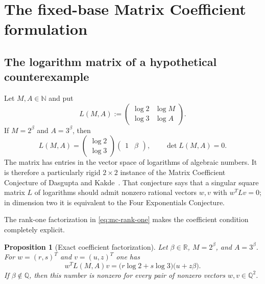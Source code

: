 \documentclass[11pt,oneside]{article}
\newtheorem{proposition}[theorem]{Proposition}
\theoremstyle{definition}
\theoremstyle{remark}
\newcommand{\N}{\mathbb N}
\newcommand{\Q}{\mathbb Q}
\newcommand{\R}{\mathbb R}
\begin{document}
\section{The fixed-base Matrix Coefficient formulation}
\label{sec:matrix-coefficient}

\subsection{The logarithm matrix of a hypothetical counterexample}

Let $M,A\in\N$ and put
\begin{equation}
 L(M,A):=
 \begin{pmatrix}
  \log2 & \log M\\
  \log3 & \log A
 \end{pmatrix}.
 \label{eq:mc-log-matrix}
\end{equation}
If $M=2^\beta$ and $A=3^\beta$, then
\begin{equation}
 L(M,A)=
 \begin{pmatrix}\log2\\ \log3\end{pmatrix}
 \begin{pmatrix}1&\beta\end{pmatrix},
 \qquad
 \det L(M,A)=0.
 \label{eq:mc-rank-one}
\end{equation}
The matrix has entries in the vector space of logarithms of algebraic numbers.  It is therefore
a particularly rigid $2\times2$ instance of the Matrix Coefficient Conjecture of
Dasgupta and Kakde~\cite{DasguptaKakdeMCC}.  That conjecture says that a singular square
matrix $L$ of logarithms should admit nonzero rational vectors $w,v$ with
$w^TLv=0$; in dimension two it is equivalent to the Four Exponentials Conjecture.

The rank-one factorization in \eqref{eq:mc-rank-one} makes the coefficient condition completely
explicit.

\begin{proposition}[Exact coefficient factorization]
\label{prop:mc-factorization}
Let $\beta\in\R$, $M=2^\beta$, and $A=3^\beta$.  For
$w=(r,s)^T$ and $v=(u,z)^T$ one has
\begin{equation}
 w^T L(M,A)v
 =\bigl(r\log2+s\log3\bigr)\bigl(u+z\beta\bigr).
 \label{eq:mc-coefficient-product}
\end{equation}
If $\beta\notin\Q$, then this number is nonzero for every pair of nonzero vectors
$w,v\in\Q^2$.
\end{proposition}
\end{document}
